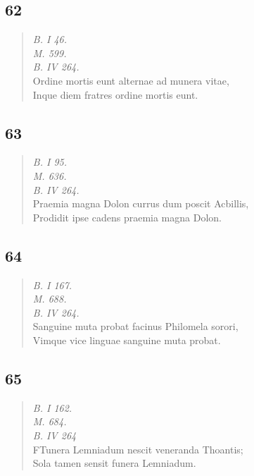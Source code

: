 \documentclass[11pt, a4paper]{report}
\begin{document}
            \subsection*{62}
      \begin{verse}
      \textit{B. I 46.} \\ \textit{M. 599.} \\ \textit{B. IV 264.} \\ Ordine mortis eunt alternae ad munera vitae, \\ Inque diem fratres ordine mortis eunt. \\ 
      \end{verse}
  
            \subsection*{63}
      \begin{verse}
      \textit{B. I 95.} \\ \textit{M. 636.} \\ \textit{B. IV 264.} \\ Praemia magna Dolon currus dum poscit Acbillis, \\ Prodidit ipse cadens praemia magna Dolon. \\ 
      \end{verse}
  
            \subsection*{64}
      \begin{verse}
      \textit{B. I 167.} \\ \textit{M. 688.} \\ \textit{B. IV 264.} \\ Sanguine muta probat facinus Philomela sorori, \\ Vimque vice linguae sanguine muta probat. \\ 
      \end{verse}
  
            \subsection*{65}
      \begin{verse}
      \textit{B. I 162.} \\ \textit{M. 684.} \\ \textit{B. IV 264} \\ FTunera Lemniadum nescit veneranda Thoantis; \\ Sola tamen sensit funera Lemniadum. \\ 
      \end{verse}
  
\end{document}
